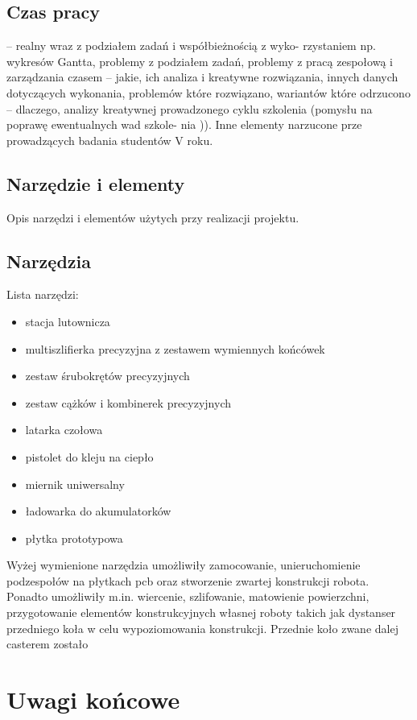 \documentclass[11pt,a4paper]{article}
\begin{document}
\subsection{Czas pracy} – realny wraz z podziałem zadań i współbieżnością z wyko-
rzystaniem np. wykresów Gantta, problemy z podziałem zadań, problemy z pracą zespołową i
zarządzania czasem – jakie, ich analiza i kreatywne rozwiązania, innych danych dotyczących
wykonania, problemów które rozwiązano, wariantów które odrzucono – dlaczego, analizy
kreatywnej prowadzonego cyklu szkolenia (pomysłu na poprawę ewentualnych wad szkole-
nia )). Inne elementy narzucone prze prowadzących badania studentów V roku.

\subsection{Narzędzie i elementy}
Opis narzędzi i elementów użytych przy realizacji projektu.
\subsection{Narzędzia}
Lista narzędzi:
\begin{itemize}
  \item stacja lutownicza
  \item multiszlifierka precyzyjna z zestawem wymiennych końcówek
  \item zestaw śrubokrętów precyzyjnych
  \item zestaw cążków i kombinerek precyzyjnych
  \item latarka czołowa
  \item pistolet do kleju na ciepło
  \item miernik uniwersalny
  \item ładowarka do akumulatorków
  \item płytka prototypowa
\end{itemize}

Wyżej wymienione narzędzia umożliwiły zamocowanie, unieruchomienie podzespołów na płytkach pcb oraz stworzenie zwartej konstrukcji robota. Ponadto umożliwiły m.in. wiercenie, szlifowanie, matowienie powierzchni, przygotowanie elementów konstrukcyjnych własnej roboty takich jak dystanser przedniego koła w celu wypoziomowania konstrukcji.
Przednie koło zwane dalej casterem zostało 

\section{Uwagi końcowe}
\end{document}
